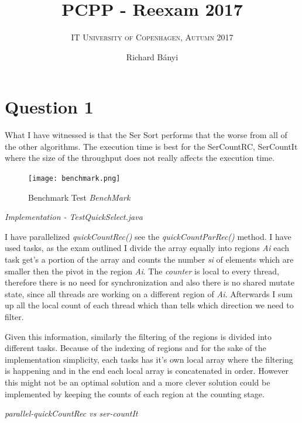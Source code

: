 \documentclass[format=acmsmall, review=false, screen=true]{acmart}
\author{Richard Bányi}
\title{\textsc{PCPP} - Reexam 2017}
\subtitle{\textsc{IT University of Copenhagen, Autumn 2017}}
\begin{document}
\maketitle

\section{Question 1}

What I have witnessed is that the Ser Sort performs that the worse from all of the other algorithms. The execution time is best for the SerCountRC, SerCountIt where the size of the throughput does not really affects the execution time.

\begin{figure}
  \texttt{[image: benchmark.png]}
  \caption{Benchmark Test \textit{BenchMark}}
  \label{fig:benchmark}
\end{figure}

\textit{Implementation - TestQuickSelect.java}

I have parallelized \textit{quickCountRec()}  see the \textit{quickCountParRec()} method.
I have used tasks, as the exam outlined I divide the array equally into regions \textit{Ai} each task get's a portion of the array and counts the number \textit{si} of elements which are smaller then the pivot in the region \textit{Ai}. The \textit{counter} is local to every thread, therefore there is no need for synchronization and also there is no shared mutate state, since all threads are working on a different region of \textit{Ai}. Afterwards I sum up all the local count of each thread which than tells which direction we need to filter.

Given this information, similarly the filtering of the regions is divided into different tasks. Because of the indexing of regions and for the sake of the implementation simplicity, each tasks has it's own local array where the filtering is happening and in the end each local array is concatenated in order. However this might not be an optimal solution and a more clever solution could be implemented by keeping the counts of each region at the counting stage.

\textit{parallel-quickCountRec vs ser-countIt}
\end{document}
